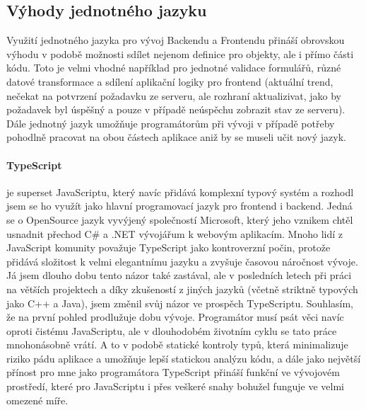 \subsection{Výhody jednotného jazyku}
Využití jednotného jazyka pro vývoj Backendu a Frontendu přináší obrovskou výhodu v podobě možnosti sdílet nejenom definice pro objekty, ale i přímo části kódu. Toto je velmi vhodné například pro jednotné validace formulářů, různé datové transformace a sdílení aplikační logiky pro frontend  (aktuální trend, nečekat na potvrzení požadavku ze serveru, ale rozhraní aktualizivat, jako by požadavek byl úspěšný a pouze v případě neúspěchu zobrazit stav ze serveru). Dále jednotný jazyk umožňuje programátorům při vývoji v případě potřeby pohodlně pracovat na obou částech aplikace aniž by se museli učit nový jazyk.

\paragraph{TypeScript} je superset JavaScriptu, který navíc přidává komplexní typový systém a rozhodl jsem se ho využít jako hlavní programovací jazyk pro frontend i backend. Jedná se o OpenSource jazyk vyvýjený společností Microsoft, který jeho vznikem chtěl usnadnit přechod C\# a .NET vývojářum k webovým aplikacím. Mnoho lidí z JavaScript komunity považuje TypeScript jako kontroverzní počin, protože přidává složitost k velmi elegantnímu jazyku a zvyšuje časovou náročnost vývoje. Já jsem dlouho dobu tento názor také zastával, ale v posledních letech při práci na větších projektech a díky zkušeností z jiných jazyků (včetně striktně typových jako C++ a Java), jsem změnil svůj názor ve prospěch TypeScriptu. Souhlasím, že na první pohled prodlužuje dobu vývoje. Programátor musí psát věci navíc oproti čistému JavaScriptu, ale v dlouhodobém životním cyklu se tato práce  mnohonásobně vrátí. A to v podobě statické kontroly typů, která minimalizuje riziko pádu aplikace a umožňuje  lepší statickou analýzu kódu, a dále jako největší přínost pro mne jako programátora TypeScript přináší funkční  ve vývojovém prostředí, které pro JavaScriptu i přes veškeré snahy bohužel funguje ve velmi omezené míře.

